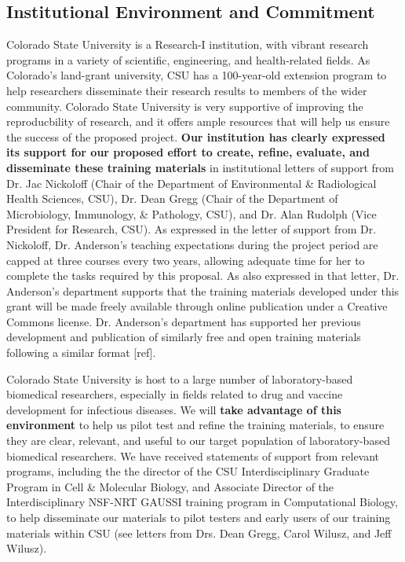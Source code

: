 \documentclass[pdftex,english,11pt,parskip=half]{scrartcl}
\begin{document}
\subsection{Institutional Environment and Commitment}

Colorado State University is a Research-I institution, with vibrant research programs in a variety of scientific, engineering, and health-related fields. As Colorado's land-grant university, CSU has a 100-year-old extension program to help researchers disseminate their research results to members of the wider community. Colorado State University is very supportive of improving the reproducbility of
research, and it offers ample resources that will help us ensure the success of
the proposed project. \textbf{Our institution has clearly expressed its support
for our proposed effort to create, refine, evaluate, and disseminate these
training materials} in institutional letters of support from Dr. Jac Nickoloff
(Chair of the Department of Environmental \& Radiological Health Sciences, CSU),
Dr. Dean Gregg (Chair of the Department of Microbiology, Immunology, \&
Pathology, CSU), and Dr. Alan Rudolph (Vice President for Research, CSU). As
expressed in the letter of support from Dr. Nickoloff, Dr. Anderson's teaching
expectations during the project period are capped at three courses every two
years, allowing adequate time for her to complete the tasks required by this
proposal. As also expressed in that letter, Dr. Anderson's department supports
that the training materials developed under this grant will be made freely
available through online publication under a Creative Commons license. Dr.
Anderson's department has supported her previous development and publication of
similarly free and open training materials following a similar format [ref].

Colorado State University is host to a large number of laboratory-based
biomedical researchers, especially in fields related to drug and vaccine
development for infectious diseases. We will \textbf{take advantage of this
environment} to help us pilot test and refine the training materials, to ensure
they are clear, relevant, and useful to our target population of
laboratory-based biomedical researchers. We have received statements of support
from relevant programs, including the the director of the CSU Interdisciplinary
Graduate Program in Cell \& Molecular Biology, and Associate Director of the
Interdisciplinary NSF-NRT GAUSSI training program in Computational Biology, to
help disseminate our materials to pilot testers and early users of our training
materials within CSU (see letters from Drs. Dean Gregg, Carol Wilusz, and Jeff
Wilusz). 
\end{document}
